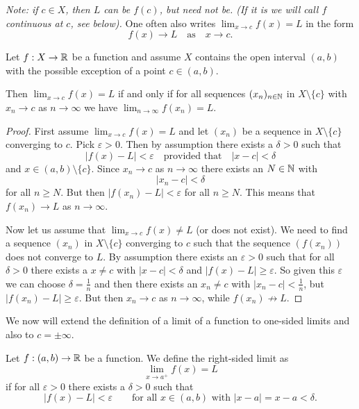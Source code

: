\documentclass[10pt, a4paper]{article}
\newcommand{\seq}[1][x]{(#1_n)_{n \in \N}}
\begin{document}
\textit{Note:
if $c \in X$,
then $L$ can be $f(c)$,
but need not be.
(If it is we will call $f$ continuous at $c$,
see below).}
One often also writes $\lim_{x \rightarrow c}f(x) = L$ in the form
\[
f(x) \rightarrow L\quad\text{as}\quad x \rightarrow c.
\]

\begin{proposition}\label{pre:analy:prop:funclimcriterion}
    Let $f : X \rightarrow \mathbb{R}$ be a function and assume $X$ contains the open interval $(a, b)$ with the possible exception of a point $c \in (a, b)$.
    
    Then $\lim_{x \rightarrow c}f(x) = L$ if and only if for all sequences $\seq$ in $X \setminus \{c\}$ with $x_n \rightarrow c$ as $n \rightarrow \infty$ we have $\lim_{n \rightarrow \infty}f(x_n) = L$.
    \begin{proof}
        First assume $\lim_{x \rightarrow c}f(x) = L$ and let $(x_n)$ be a sequence in $X \setminus \{c\}$ converging to $c$.
        Pick $\varepsilon > 0$.
        Then by assumption there exists a $\delta > 0$ such that
        \[
        |f(x) - L| < \varepsilon\quad\text{provided that}\quad|x - c| < \delta
        \]
        and $x \in (a, b) \setminus \{c\}$.
        Since $x_n \rightarrow c$ as $n \rightarrow \infty$ there exists an $N \in \mathbb{N}$ with
        \[
        |x_n - c| < \delta
        \]
        for all $n \geq N$.
        But then $|f(x_n) - L| < \varepsilon$ for all $n \geq N$.
        This means that $f(x_n) \rightarrow L$ as $n \rightarrow \infty$.

        Now let us assume that $\lim_{x \rightarrow c}f(x) \neq L$
        (or does not exist).
        We need to find a sequence $(x_n)$ in $X \setminus \{c\}$ converging to $c$ such that the sequence $(f(x_n))$ does not converge to $L$.
        By assumption there exists an $\varepsilon > 0$ such that for all $\delta > 0$ there exists a $x \neq c$ with $|x - c| < \delta$ and $|f(x) - L| \geq \varepsilon$.
        So given this $\varepsilon$ we can choose $\delta = \frac{1}{n}$ and then there exists an $x_n \neq c$ with $|x_n - c| < \frac{1}{n}$,
        but $|f(x_n) - L| \geq \varepsilon$.
        But then $x_n \rightarrow c$ as $n \rightarrow \infty$,
        while $f(x_n) \nrightarrow L$.
    \end{proof}
\end{proposition}

We now will extend the definition of a limit of a function to one-sided limits and also to $c = \pm\infty$.
\begin{definition}
    Let $f : (a, b) \rightarrow \mathbb{R}$ be a function.
    We define the right-sided limit as
    \[
    \lim_{x \rightarrow a ^ {+}}f(x) = L
    \]
    if for all $\varepsilon > 0$ there exists a $\delta > 0$ such that
    \[
    |f(x) - L| < \varepsilon\qquad\text{for all } x \in (a, b)\text{ with }|x - a| = x - a < \delta.
    \]
\end{definition}
\end{document}
